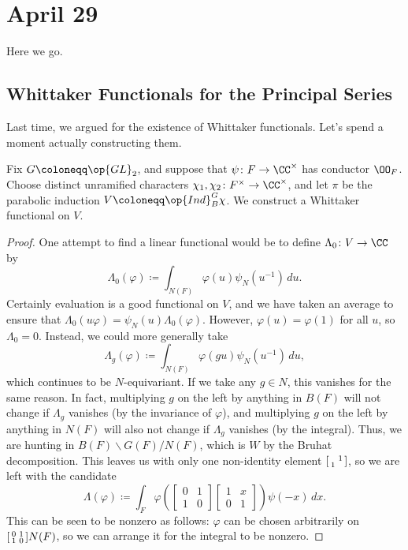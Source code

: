 \documentclass[../notes.tex]{subfiles}
\begin{document}
\section{April 29}
Here we go.

\subsection{Whittaker Functionals for the Principal Series}
Last time, we argued for the existence of Whittaker functionals. Let's spend a moment actually constructing them.
\begin{exe}
	Fix $G\coloneqq\op{GL}_2$, and suppose that $\psi\colon F\to\CC^\times$ has conductor $\OO_F$. Choose distinct unramified characters $\chi_1,\chi_2\colon F^\times\to\CC^\times$, and let $\pi$ be the parabolic induction $V\coloneqq\op{Ind}_B^G\chi$. We construct a Whittaker functional on $V$.
\end{exe}
\begin{proof}
	One attempt to find a linear functional would be to define $\Lambda_0\colon V\to\CC$ by
	\[\Lambda_0(\varphi)\coloneqq\int_{N(F)}\varphi(u)\psi_N\left(u^{-1}\right)\,du.\]
	Certainly evaluation is a good functional on $V$, and we have taken an average to ensure that $\Lambda_0(u\varphi)=\psi_N(u)\Lambda_0(\varphi)$. However, $\varphi(u)=\varphi(1)$ for all $u$, so $\Lambda_0=0$. Instead, we could more generally take
	\[\Lambda_g(\varphi)\coloneqq\int_{N(F)}\varphi(gu)\psi_N\left(u^{-1}\right)\,du,\]
	which continues to be $N$-equivariant. If we take any $g\in N$, this vanishes for the same reason. In fact, multiplying $g$ on the left by anything in $B(F)$ will not change if $\Lambda_g$ vanishes (by the invariance of $\varphi$), and multiplying $g$ on the left by anything in $N(F)$ will also not change if $\Lambda_g$ vanishes (by the integral). Thus, we are hunting in $B(F)\backslash G(F)/N(F)$, which is $W$ by the Bruhat decomposition. This leaves us with only one non-identity element $\begin{bsmallmatrix}
		& 1 \\ 1
	\end{bsmallmatrix}$, so we are left with the candidate
	\[\Lambda(\varphi)\coloneqq\int_F\varphi\left(\begin{bmatrix}
		0 & 1 \\ 1 & 0
	\end{bmatrix}\begin{bmatrix}
		1 & x \\ 0 & 1
	\end{bmatrix}\right)\psi(-x)\,dx.\]
	This can be seen to be nonzero as follows: $\varphi$ can be chosen arbitrarily on $\begin{bsmallmatrix}
		0 & 1 \\ 1 & 0
	\end{bsmallmatrix}N(F)$, so we can arrange it for the integral to be nonzero.
\end{proof}
\end{document}
